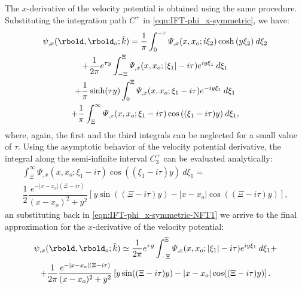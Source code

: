 The $x$-derivative of the velocity potential is obtained using the same procedure. Substituting the integration path $C^{+}$ in \eqref{eqn:IFT-phi_x-symmetric}, we have:
%
\begin{multline}
\label{eqn:IFT-phi_x-symmetric-NFT1}
\psi_{,x}(\rbold,\rbold_{o}; \hat{k}) = 
 \dfrac{1}{\pi} \int_{0}^{-\tau} 
 \varPsi_{,x} (x,x_o;i \xi_{2}) \cosh{(y \xi_{2})} \:d\xi_{2}
\\
+ \dfrac{1}{2\pi} e^{\tau y} \int_{-\Xi}^{\Xi} 
 \varPsi_{,x} (x,x_o;\vert \xi_{1} \vert -i\tau)  e^{i y \xi_{1}} \:d\xi_{1}
\\
+ \dfrac{1}{\pi} \sinh(\tau y) \int_{0}^{\Xi} 
 \varPsi_{,x} (x,x_o; \xi_{1} -i\tau)  e^{-i y \xi_{1}} \:d\xi_{1}
\\
+ \dfrac{1}{\pi} \int_{\Xi}^{\infty}
 \varPsi_{,x} (x,x_o; \xi_{1} -i\tau) \cos{((\xi_{1}-i\tau)y)} \:d\xi_{1},
\end{multline}
%
where, again, the first and the third integrals can be neglected for a small value of $\tau$. Using the asymptotic behavior of the velocity potential derivative, the integral along the semi-infinite interval $C_3^+$ can be evaluated analytically:
%
\begin{multline}
\int_{\Xi}^{\infty}
 \varPsi_{,x} (x,x_o; \xi_{1} -i\tau) \cos{((\xi_{1}-i\tau)y)} \:d\xi_{1}
 = \\
\dfrac{1}{2} \dfrac{e^{-| x-x_o | (\Xi-i \tau)}}{(x-x_o)^{2}+y^{2}} \left[ y \sin((\Xi-i\tau)y) -| x-x_o| \cos((\Xi-i\tau)y) \right],
\end{multline}
an substituting back in \eqref{eqn:IFT-phi_x-symmetric-NFT1} we arrive to the final approximation for the $x$-derivative of the velocity potential:
%
\begin{multline}
\label{eqn:IFT-phi_x-symmetric-NFT2}
\psi_{,x}(\rbold,\rbold_{o}; \hat{k})  \simeq 
\dfrac{1}{2\pi} e^{\tau y} \int_{-\Xi}^{\Xi} \varPsi_{,x} (x,x_o;| \xi_{1} | -i\tau)  e^{iy \xi_{1}} \:d\xi_{1} + \\ 
+ \dfrac{1}{2\pi} \dfrac{e^{-| x-x_o | (\Xi-i \tau)}}{(x-x_o)^{2}+y^{2}} \left[ y \sin((\Xi-i\tau)y) -| x-x_o| \cos((\Xi-i\tau)y) \right].
\end{multline}
%

